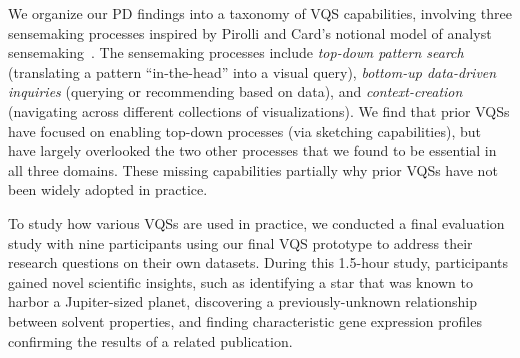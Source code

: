  \par We organize our PD findings into a taxonomy of VQS capabilities, involving three sensemaking processes inspired by Pirolli and Card's notional model of analyst sensemaking~\cite{Pirolli}. The sensemaking processes include \emph{top-down pattern search} (translating a pattern ``in-the-head'' into a visual query), \emph{bottom-up data-driven inquiries} (querying or recommending based on data), and \emph{context-creation} (navigating across different collections of visualizations). We find that prior VQSs have focused on enabling top-down processes (via sketching capabilities), but have largely overlooked the two other processes that we found to be essential in all three domains. These missing capabilities partially  why prior VQSs have not been widely adopted in practice.
 \par To study how various VQSs are used in practice, we conducted a final evaluation study with nine participants using our final VQS prototype to address their research questions on their own datasets. During this 1.5-hour study, participants gained novel scientific insights,
 such as identifying a star that was known to harbor a Jupiter-sized planet, discovering a previously-unknown relationship between solvent properties, and finding characteristic gene expression profiles confirming the results of a related publication. %
